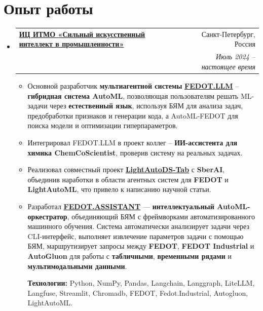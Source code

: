 \documentclass[letterpaper,11pt]{article}
\makeatletter
\newcommand{\resumeItemNoBold}[1]{
  \item\small{
    {\raggedright #1 \vspace{-2pt}}
  }
}
\newcommand{\resumeSubheading}[4]{
  \vspace{-1pt}\item
    \begin{tabular*}{0.97\textwidth}[t]{p{0.7\textwidth}@{\extracolsep{\fill}}r}
      \textbf{#1} & #2 \\
      \textit{\small\raggedright#3} & \textit{\small #4} \\
    \end{tabular*}\vspace{-5pt}
}
\newcommand{\resumeSubHeadingListStart}{\begin{itemize}[leftmargin=*]}
\newcommand{\resumeSubHeadingListEnd}{\end{itemize}}
\newcommand{\resumeItemListStart}{\begin{itemize}}
\newcommand{\resumeItemListEnd}{\end{itemize}\vspace{-5pt}}
\makeatother
\begin{document}
\section{Опыт работы}
\resumeSubHeadingListStart
\resumeSubheading
{\href{https://aim.club/}{ИЦ ИТМО «Сильный искусственный интеллект в промышленности»}}{Санкт-Петербург, Россия}
{AI Engineer}{Июль 2024 -- настоящее время}
\resumeItemListStart
\resumeItemNoBold{Основной разработчик \textbf{мультиагентной системы} \href{https://github.com/aimclub/FEDOT.LLM}{\textbf{FEDOT.LLM}} -- \textbf{гибридная система AutoML}, позволяющая пользователям решать ML-задачи через \textbf{естественный язык}, используя БЯМ для анализа задач, предобработки признаков и генерации кода, а AutoML-FEDOT для поиска модели и оптимизации гиперпараметров.}
\resumeItemNoBold{Интегрировал FEDOT.LLM в проект коллег -- \textbf{ИИ-ассистента для химика ChemCoScientist}, проверив систему на реальных задачах.}
\resumeItemNoBold{Реализовал совместный проект \href{https://github.com/sb-ai-lab/LADS}{\textbf{LightAutoDS-Tab}} с \textbf{SberAI}, объединив наработки в области агентных систем для \textbf{FEDOT} и \textbf{LightAutoML}, что привело к написанию научной статьи.}
\resumeItemNoBold{Разработал \href{https://github.com/AaLexUser/Fedot-assistant}{\textbf{FEDOT.ASSISTANT}} — \textbf{интеллектуальный AutoML-оркестратор}, объединяющий БЯМ с фреймворками автоматизированного машинного обучения. Система автоматически анализирует задачи через CLI-интерфейс, выполняет извлечение параметров задачи с помощью БЯМ, маршрутизирует запросы между \textbf{FEDOT}, \textbf{FEDOT Industrial} и \textbf{AutoGluon} для работы с \textbf{табличными}, \textbf{временными рядами} и \textbf{мультимодальными данными}.}

\textbf{Технологии:} Python, NumPy, Pandas, Langchain, Langgraph, LiteLLM, Langfuse, Streamlit, Chromadb, FEDOT, Fedot.Industrial, Autogluon, LightAutoML.
\resumeItemListEnd
\resumeSubHeadingListEnd
\end{document}
